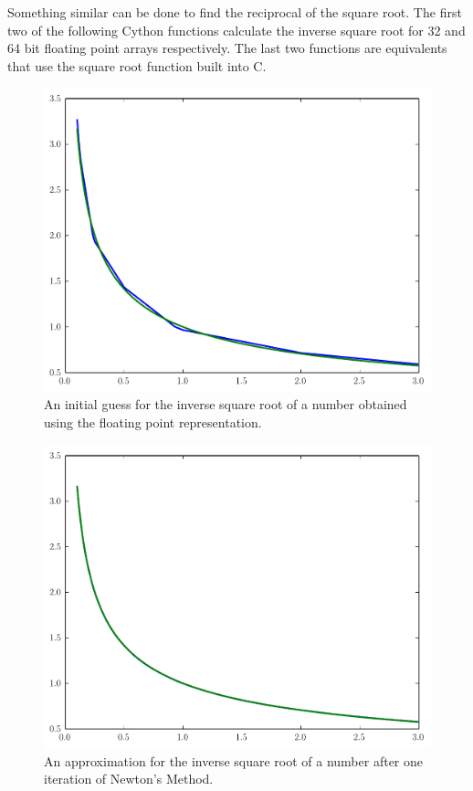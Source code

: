 Something similar can be done to find the reciprocal of the square root.
The first two of the following Cython functions calculate the inverse square root for 32 and 64 bit floating point arrays respectively.
The last two functions are equivalents that use the square root function built into C.



\begin{figure}
\includegraphics[width=\textwidth]{invsqrt0}
\caption{An initial guess for the inverse square root of a number obtained using the floating point representation.}
\label{float:invsqrt0}
\end{figure}

\begin{figure}
\includegraphics[width=\textwidth]{invsqrt1}
\caption{An approximation for the inverse square root of a number after one iteration of Newton's Method.}
\label{float:invsqrt1}
\end{figure}

